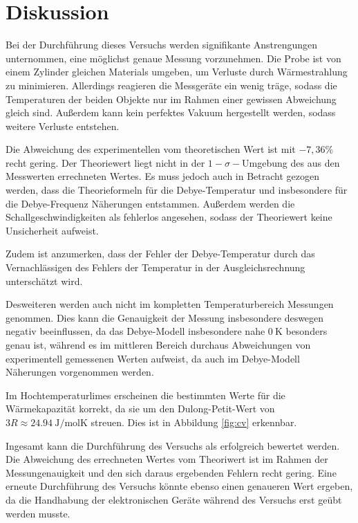 \section{Diskussion}
\label{sec:Diskussion}

Bei der Durchführung dieses Versuchs werden signifikante Anstrengungen unternommen, eine möglichst genaue Messung vorzunehmen.
Die Probe ist von einem Zylinder gleichen Materials umgeben, um Verluste durch Wärmestrahlung zu minimieren.
Allerdings reagieren die Messgeräte ein wenig träge, sodass die Temperaturen der beiden Objekte nur im Rahmen einer gewissen Abweichung gleich sind. Außerdem kann kein perfektes Vakuum hergestellt werden, sodass weitere Verluste entstehen.

Die Abweichung des experimentellen vom theoretischen Wert ist mit $-7,36\%$ recht gering.
Der Theoriewert liegt nicht in der $1-\sigma-$Umgebung des aus den Messwerten errechneten
Wertes. Es muss jedoch auch in Betracht gezogen werden, dass die Theorieformeln für die Debye-Temperatur und insbesondere für die Debye-Frequenz Näherungen entstammen. Außerdem werden die Schallgeschwindigkeiten als fehlerlos angesehen, sodass der Theoriewert keine Unsicherheit aufweist.

Zudem ist anzumerken, dass der Fehler der Debye-Temperatur durch das Vernachlässigen des
Fehlers der Temperatur in der Ausgleichsrechnung unterschätzt wird. 

Desweiteren werden auch nicht im kompletten Temperaturbereich Messungen genommen. Dies kann die Genauigkeit der Messung insbesondere deswegen negativ beeinflussen, da das Debye-Modell insbesondere nahe $\SI{0}{\kelvin}$ besonders genau ist, während es im mittleren Bereich durchaus Abweichungen von experimentell gemessenen Werten aufweist, da auch im Debye-Modell Näherungen vorgenommen werden.

Im Hochtemperaturlimes erscheinen die bestimmten Werte für die Wärmekapazität korrekt,
da sie um den Dulong-Petit-Wert von $3R \approx \SI{24.94}{\joule\per\mole\kelvin}$ streuen.
Dies ist in Abbildung \ref{fig:cv} erkennbar.

Ingesamt kann die Durchführung des Versuchs als erfolgreich bewertet werden.
Die Abweichung des errechneten Wertes vom Theoriwert ist im Rahmen der Messungenauigkeit
und den sich daraus ergebenden Fehlern recht gering.
Eine erneute Durchführung des Versuchs könnte ebenso einen genaueren Wert ergeben, da die Handhabung der elektronischen Geräte während des Versuchs erst geübt werden musste.

%
%
%
